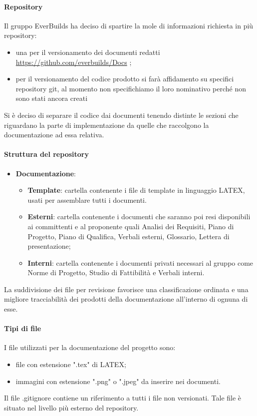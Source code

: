 			\paragraph{Repository}
				Il gruppo EverBuilds ha deciso di spartire la mole di informazioni richiesta in più repository:
				\begin{itemize}
					\item una per il versionamento dei documenti redatti \url{https://github.com/everbuilds/Docs} ;
					\item per il versionamento del codice prodotto si farà affidamento su specifici repository git, al momento non specifichiamo il loro nominativo perché non sono stati ancora creati
				\end{itemize}
				Si è deciso di separare il codice dai documenti tenendo distinte le sezioni che riguardano la parte di implementazione da quelle che raccolgono la documentazione ad essa relativa.\\
			\paragraph{Struttura del repository}
				\begin{itemize}
					\item\textbf{Documentazione}:
						\begin{itemize}
							\item\textbf{Template}: cartella contenente i file di template in linguaggio LATEX, usati per assemblare tutti i documenti. 
							\item\textbf{Esterni}: cartella contenente i documenti che saranno poi resi disponibili ai committenti e al proponente quali Analisi dei Requisiti, Piano di Progetto, Piano di Qualifica, Verbali esterni, Glossario, Lettera di presentazione;
							\item\textbf{Interni}: cartella contenente i documenti privati necessari al gruppo come Norme di Progetto, Studio di Fattibilità e Verbali interni.
							
						\end{itemize}
				\end{itemize}
				La suddivisione dei file per revisione favorisce una classificazione ordinata e una migliore tracciabilità dei prodotti della documentazione all’interno di ognuna di esse.
			\paragraph{Tipi di file}
				I file utilizzati per la documentazione del progetto sono:
				\begin{itemize}
					\item file con estensione ".tex" di LATEX;
					\item immagini con estensione ".png" o ".jpeg" da inserire nei documenti.
				\end{itemize}
				Il file .gitignore contiene un riferimento a tutti i file non versionati. Tale file è situato nel livello più esterno del repository.

